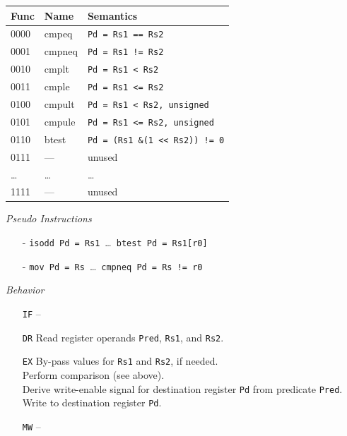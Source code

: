 \documentclass{IEEEtran}
\newcommand{\AND}{\&\xspace}
\newcommand{\shl}{\textless$\!$\textless\xspace}
\begin{document}
\begin{tabular}{lll}
  Func & Name   & Semantics \\ \hline
  0000 & cmpeq  & \texttt{Pd = Rs1 ==  Rs2} \\
  0001 & cmpneq & \texttt{Pd = Rs1 !=  Rs2} \\
  0010 & cmplt  & \texttt{Pd = Rs1 \textless\ Rs2} \\
  0011 & cmple  & \texttt{Pd = Rs1 \textless= Rs2} \\
  0100 & cmpult & \texttt{Pd = Rs1 \textless\ Rs2, unsigned} \\
  0101 & cmpule & \texttt{Pd = Rs1 \textless= Rs2, unsigned} \\
  0110 & btest  & \texttt{Pd = (Rs1 \AND (1 \shl Rs2)) != 0} \\
  0111 & ---    & unused \\
  \dots& \dots  & \dots \\
  1111 & ---    & unused \\ \hline
\end{tabular}

\vspace{7mm}
\emph{Pseudo Instructions}
\begin{itemize}
  \item[-] \texttt{isodd Pd = Rs1}~\dots~\texttt{btest Pd = Rs1[r0]}
  \item[-] \texttt{mov Pd = Rs}~\dots~\texttt{cmpneq Pd = Rs != r0}
\end{itemize}

\vspace{7mm}
\emph{Behavior}
\begin{itemize}
  \item[\texttt{IF}] --
  \item[\texttt{DR}] Read register operands \texttt{Pred}, \texttt{Rs1}, and
                     \texttt{Rs2}.
  \item[\texttt{EX}] By-pass values for \texttt{Rs1} and \texttt{Rs2}, if
                     needed. \\
                     Perform comparison (see above). \\
                     Derive write-enable signal for destination register
                     \texttt{Pd} from predicate \texttt{Pred}. \\
                     Write to destination register \texttt{Pd}.
  \item[\texttt{MW}] --
\end{itemize}
\end{document}
